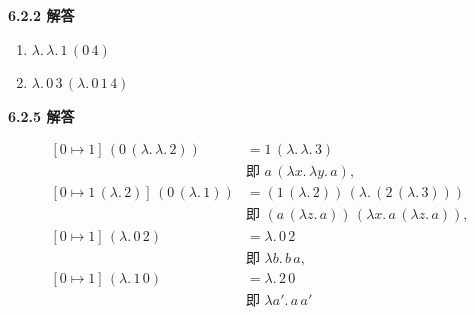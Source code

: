 \begin{taplauthorsolutionentrybox}
\label{sol:author:6.2.2}
\textbf{6.2.2 解答}
\begin{enumerate}
  \item \(\lambda.\,\lambda.\,1\,(0\,4)\)
  \item \(\lambda.\,0\,3\,(\lambda.\,0\,1\,4)\)
\end{enumerate}
\end{taplauthorsolutionentrybox}

\begin{taplauthorsolutionentrybox}
\label{sol:author:6.2.5}
\textbf{6.2.5 解答}

\[
\begin{aligned}
[0\mapsto1]\,(0\,(\lambda.\,\lambda.\,2))
  &=1\,(\lambda.\,\lambda.\,3)\\
  &\text{即 }a\,(\lambda x.\,\lambda y.\,a),\\[4pt]
[0\mapsto1\,(\lambda.\,2)]\,(0\,(\lambda.\,1))
  &=(1\,(\lambda.\,2))\,
    (\lambda.\,(2\,(\lambda.\,3)))\\
  &\text{即 }(a\,(\lambda z.\,a))\,
    (\lambda x.\,a\,(\lambda z.\,a)),\\[4pt]
[0\mapsto1]\,(\lambda.\,0\,2)
  &=\lambda.\,0\,2\\
  &\text{即 }\lambda b.\,b\,a,\\[4pt]
[0\mapsto1]\,(\lambda.\,1\,0)
  &=\lambda.\,2\,0\\
  &\text{即 }\lambda a'.\,a\,a'
\end{aligned}
\]

\end{taplauthorsolutionentrybox}
